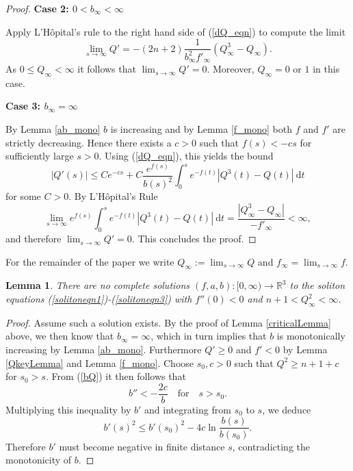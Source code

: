 \documentclass{amsart}
\newtheorem{lem}[thm]{Lemma}
\theoremstyle{definition}
\theoremstyle{remark}
\numberwithin{equation}{section}
\newcommand{\R}{\mathbb{R}}  %
\begin{document}
\begin{proof}
\vspace{0.5em}
\noindent\textbf{Case 2: $0 <b_{\infty} < \infty$}
\vspace{0.5em}

\noindent Apply L'H\^opital's rule to the right hand side of (\ref{dQ_eqn}) to compute the limit
\begin{equation*}
\label{Q_lim}
\lim_{s\rightarrow\infty} Q' = -(2n+2)\frac{1}{b_{\infty}^2 f'_{\infty}}\left(Q_{\infty}^3- Q_{\infty}\right).
\end{equation*}
As $0\leq Q_{\infty}< \infty$ it follows that $\lim_{s\rightarrow\infty} Q' = 0$. Moreover, $Q_{\infty} = 0$ or $1$ in this case.

\vspace{0.5em}
\noindent\textbf{Case 3: $b_{\infty} = \infty$}
\vspace{0.5em}

\noindent By Lemma \ref{ab_mono} $b$ is increasing and by Lemma \ref{f_mono} both $f$ and $f'$ are strictly decreasing. Hence there exists a $c>0$ such that $f(s) < - cs$ for sufficiently large $s>0$. Using (\ref{dQ_eqn}), this yields the bound
$$ |Q'(s)| \leq C e^{-cs} + C \frac{e^{f(s)}}{b(s)^2} \int_{0}^s e^{-f(t)} \left| Q^3(t)- Q(t) \right| \: \mathrm{d}t $$
for some $C>0$. By L'H\^opital's Rule  
$$ \lim_{s\rightarrow \infty} e^{f(s)} \int_{0}^s e^{-f(t)} \left| Q^3(t)- Q(t) \right| \: \mathrm{d}t = \frac{\left| Q_\infty^3 - Q_\infty \right|}{-f'_{\infty}} < \infty,$$
and therefore $\lim_{s\rightarrow \infty} Q' =0$. This concludes the proof.

\end{proof}

For the remainder of the paper we write $Q_{\infty} := \lim_{s\rightarrow\infty} Q$ and $f_{\infty} = \lim_{s\rightarrow\infty} f$.
\begin{lem}
\label{Qinftyn+1}
There are no complete solutions $(f,a,b): [0,\infty) \rightarrow \R^3$ to the soliton equations (\ref{solitoneqn1})-(\ref{solitoneqn3}) with $f''(0) < 0$ and $n + 1 < Q^2_{\infty}<\infty$.
\end{lem}
\begin{proof}
Assume such a solution exists. By the proof of Lemma \ref{criticalLemma} above, we then know that $b_{\infty}= \infty$, which in turn implies that $b$ is monotonically increasing by Lemma \ref{ab_mono}. Furthermore $Q' \geq 0$ and $f' < 0$ by Lemma \ref{QkeyLemma} and Lemma \ref{f_mono}. Choose $s_0, c>0$ such that $Q^2 \geq n + 1 + c$ for $s_0>s$. From (\ref{bQ}) it then follows that
\begin{equation*}
b'' < - \frac{2c}{b} \quad \text{for} \quad s > s_0.
\end{equation*}
Multiplying this inequality by $b'$ and integrating from $s_0$ to $s$, we deduce
\begin{equation*}
b'(s)^2 \leq b'(s_0)^2 - 4c \ln \frac{b(s)}{b(s_0)}.
\end{equation*}
Therefore $b'$ must become negative in finite distance $s$, contradicting the monotonicity of $b$.
\end{proof}
\end{document}
